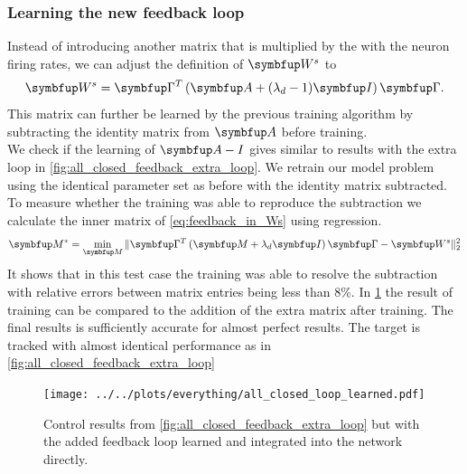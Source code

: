 \subsubsection{Learning the new feedback loop}
Instead of introducing another matrix that is multiplied by the with the neuron firing rates, we can adjust the definition of $\bmu{W}^s$ to
\begin{equation}\label{eq:feedback_in_Ws}
\bmu{W}^s = \bmu{\Gamma}^T\left(\bmu{A} + (\lambda_d-1)\bmu{I} \right)\bmu{\Gamma}.
\end{equation}
This matrix can further be learned by the previous training algorithm by subtracting the identity matrix from $\bmu{A}$ before training.\\
We check if the learning of $\bmu{A-I}$ gives similar to results  with the extra loop in \cref{fig:all_closed_feedback_extra_loop}. We retrain our model problem using the identical parameter set as before with the identity matrix subtracted.\\
To measure whether the training was able to reproduce the subtraction we calculate the inner matrix of \cref{eq:feedback_in_Ws} using regression.
\begin{equation}
	\bmu{M^*} = \min_{\bmu{M}} \| \bmu{\Gamma}^T\left(\bmu{M}+\lambda_d\bmu{I}\right)\bmu{\Gamma} - \bmu{W}^s\|_2^2
\end{equation}
It shows that in this test case the training was able to resolve the subtraction with relative errors between matrix entries being less than 8\%.
In \cref{fig:all_closed_loop_learned} the result of training can be compared to the addition of the extra matrix after training. The final results is sufficiently accurate for almost perfect results. The target is tracked with almost identical performance as in \cref{fig:all_closed_feedback_extra_loop}
\begin{figure}
	\centering
	\texttt{[image: ../../plots/everything/all\_closed\_loop\_learned.pdf]}
	\caption{Control results from \cref{fig:all_closed_feedback_extra_loop} but with the added feedback loop learned and integrated into the network directly.}
	\label{fig:all_closed_loop_learned}
\end{figure}

